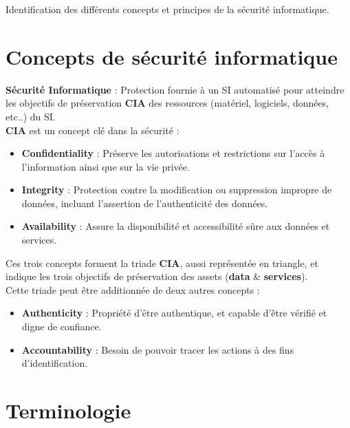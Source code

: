 \documentclass{report}
\begin{document}
	Identification des différents concepts et principes de la sécurité informatique.\\

	\section{Concepts de sécurité informatique}

		\textbf{Sécurité Informatique} : Protection fournie à un SI automatisé pour atteindre les objectifs de préservation \textbf{CIA} des ressources (matériel, logiciels, données, etc..) du SI.\\

		\textbf{CIA} est un concept clé dans la sécurité : \\

		\begin{itemize}
			\item \textbf{Confidentiality} : Préserve les autorisations et restrictions sur l'accès à l'information ainsi que sur la vie privée.\\
			\item \textbf{Integrity} : Protection contre la modification ou suppression impropre de données, incluant l'assertion de l'authenticité des données.\\
			\item \textbf{Availability} : Assure la disponibilité et accessibilité sûre aux données et services.\\
		\end{itemize}

		Ces trois concepts forment la triade \textbf{CIA}, aussi représentée en triangle, et indique les trois objectifs de préservation des assets (\textbf{data} \& \textbf{services}).\\
		Cette triade peut être additionnée de deux autres concepts : \\

		\begin{itemize}
			\item \textbf{Authenticity} : Propriété d'être authentique, et capable d'être vérifié et digne de confiance.\\
			\item \textbf{Accountability} : Besoin de pouvoir tracer les actions à des fins d'identification.\\
		\end{itemize}

	\section{Terminologie}
\end{document}

